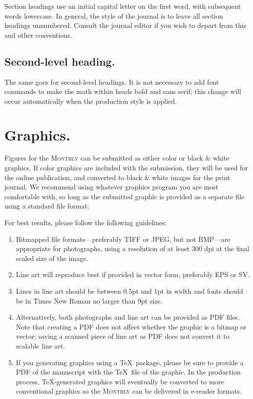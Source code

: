 \documentclass{article}
\theoremstyle{theorem}
\theoremstyle{definition}
\begin{document}
Section headings use an initial capital letter on the first word, with subsequent words lowercase.  In general, the style of the journal is to leave all section headings unnumbered.  Consult the journal editor if you wish to depart from this and other conventions.

\subsection{Second-level heading.}

The same goes for second-level headings.  It is not necessary to add font commands to make the math within heads bold and sans serif; this change will occur automatically when the production style is applied.

\section{Graphics.}

Figures for the \textsc{Monthly} can be submitted as either color or black \& white graphics.  If color graphics are included with the submission, they will be used for the online publication, and converted to black \& white images for the print journal.  We recommend using whatever graphics program you are most comfortable with, so long as the submitted graphic is provided as a separate file using a standard file format.

For best results, please follow the following guidelines:
\begin{enumerate}
\item Bitmapped file formats---preferably TIFF or JPEG, but not BMP---are appropriate for photographs, using a resolution of at least 300 dpi at the final scaled size of the image.
\item Line art will reproduce best if provided in vector form, preferably EPS or SV.
\item Lines in line art should be between 0.5pt and 1pt in width and fonts should be in Times New Roman no larger than 9pt size.
\item Alternatively, both photographs and line art can be provided as PDF files.  Note that creating a PDF does not affect whether the graphic is a bitmap or vector; saving a scanned piece of line art as PDF does not convert it to scalable line art.
\item If you generating graphics using a \TeX\ package, please be sure to provide a PDF of the manuscript with the \TeX\ file of the graphic.  In the production process, \TeX-generated graphics will eventually be converted to more conventional graphics so the \textsc{Monthly} can be delivered in e-reader formats.
\end{enumerate}
\end{document}
